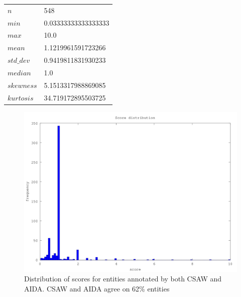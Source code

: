 \documentclass[a4paper,10pt]{article}
\begin{document}
\bigskip 
\bigskip \bigskip 
\begin{center}
\bigskip
\begin{tabular}{|l|l|}
 \hline
$n$ & 548\\ 
$min$ & 0.03333333333333333\\ 
$max$ & 10.0\\ 
$mean$ & 1.1219961591723266\\ 
$std\_ dev$ & 0.9419811831930233\\ 
$median$ & 1.0\\ 
$skewness$ & 5.1513317988869085\\ 
$kurtosis$ & 34.719172895503725\\ 

\hline
\end{tabular}
\end{center}
\bigskip
\begin{figure}[h]
 \centering
 \includegraphics[bb=0 0 576 432,scale=0.5]{./dist.png}
 \caption{Distribution of scores for entities annotated by both CSAW and AIDA. CSAW and AIDA agree on 62\% entities}
\end{figure}
\bigskip
\end{document}
